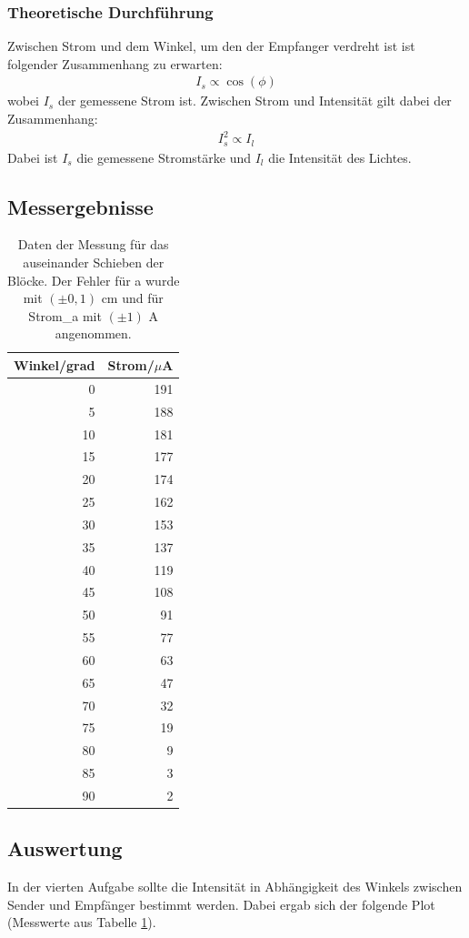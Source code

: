 \documentclass[12pt]{scrartcl}
\begin{document}
\subsubsection{Theoretische Durchführung}
Zwischen Strom und dem Winkel, um den der Empfanger verdreht ist ist folgender Zusammenhang zu erwarten:
\begin{align}
I_s \propto \cos(\phi)
\label{eqn: Aufgabe4_cos(phi)}
\end{align}
wobei $I_s$ der gemessene Strom ist.
Zwischen Strom und Intensität gilt dabei der Zusammenhang:
\begin{align}
I_s^2 \propto I_l
\end{align}
Dabei ist $I_s$ die gemessene Stromstärke und $I_l$ die Intensität des Lichtes.
\subsection{Messergebnisse}
\begin{table}[H]
\caption{Daten der Messung für das auseinander Schieben der Blöcke. Der Fehler für a wurde mit $(\pm 0,1)$ cm und für Strom\_a mit $(\pm 1)$ A angenommen.}
\centering
\begin{tabular}{|r|r|}
\hline
\multicolumn{1}{|l|}{Winkel/grad} & \multicolumn{1}{l|}{Strom/$\mu$A} \\ \hline
0 & 191 \\ \hline
5 & 188 \\ \hline
10 & 181 \\ \hline
15 & 177 \\ \hline
20 & 174 \\ \hline
25 & 162 \\ \hline
30 & 153 \\ \hline
35 & 137 \\ \hline
40 & 119 \\ \hline
45 & 108 \\ \hline
50 & 91 \\ \hline
55 & 77 \\ \hline
60 & 63 \\ \hline
65 & 47 \\ \hline
70 & 32 \\ \hline
75 & 19 \\ \hline
80 & 9 \\ \hline
85 & 3 \\ \hline
90 & 2 \\ \hline
\end{tabular}
\label{tab:a_4}
\end{table}
\subsection{Auswertung}
In der vierten Aufgabe sollte die Intensität in Abhängigkeit des Winkels zwischen Sender und Empfänger bestimmt werden. Dabei ergab sich der folgende Plot (Messwerte aus Tabelle \ref{tab:a_4}).
\end{document}
